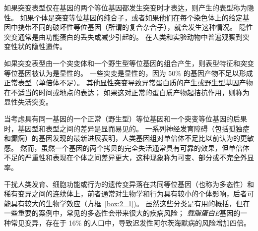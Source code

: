 如果突变表型仅在基因的两个等位基因都发生突变时才表达，则产生的表型称为隐性。
如果个体是突变等位基因的纯合子，或者如果他们在每个染色体上的给定基因中携带不同的破坏性等位基因（所谓的复合杂合子），就会发生这种情况。
隐性突变通常是由功能蛋白的丢失或减少引起的。
在人类和实验动物中普遍观察到突变性状的隐性遗传。


如果突变表型由一个突变体和一个野生型等位基因的组合产生，则表型特征和突变等位基因被认为是显性的。
一些突变是显性的，因为 50\% 的基因产物不足以形成正常表型（单倍体不足）。
其他显性突变导致异常蛋白质的产生或野生型基因产物在不适当的时间或地点的表达；
如果这对正常的蛋白质产物起拮抗作用，则称为显性失活突变。


当考虑具有同一基因的一个正常（野生型）等位基因和一个突变等位基因的后果时，基因型和表型之间的差异是显而易见的。
一系列神经发育障碍（包括孤独症和癫痫）的基因发现的最新进展表明，人类基因组对单倍体不足比以前认为的更敏感。
然而，虽然一个基因的两个拷贝的完全失活通常具有可靠的效果，但单倍体不足的严重性和表现在个体之间差异更大，这种现象称为可变、部分或不完全外显率。


干扰人类发育、细胞功能或行为的遗传变异落在共同等位基因（也称为多态性）和稀有变异之间的连续体上，前者通常对生物学和行为具有较小的个体影响，后者可能具有较大的生物学效应（方框~\ref{box:2_1})。
虽然这些分类是有用的概括，但在一些重要的案例中，常见的多态性会带来很大的疾病风险；
\textit{载脂蛋白E}基因的一种常见变异，存在于 16\% 的人口中，导致迟发性阿尔茨海默病的风险增加四倍。


